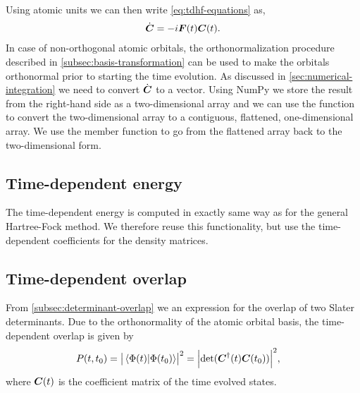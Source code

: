             Using atomic units we can then write \autoref{eq:tdhf-equations} as,
            \begin{align}
                \dot{\boldsymbol{C}} = -i\boldsymbol{F}(t)\boldsymbol{C}(t).
                \label{eq:tdhf-orthogonal}
            \end{align}
            In case of non-orthogonal atomic orbitals, the orthonormalization
            procedure described in \autoref{subsec:basis-transformation} can be
            used to make the orbitals orthonormal prior to starting the
            time evolution.
            As discussed in \autoref{sec:numerical-integration} we need to
            convert $\dot{\boldsymbol{C}}$ to a vector.
            Using NumPy we store the result from the right-hand side as a
            two-dimensional array and we can use the function  to
            convert the two-dimensional array to a contiguous, flattened,
            one-dimensional array.
            We use the member function  to go from the flattened
            array back to the two-dimensional form.

        \subsection{Time-dependent energy}
            The time-dependent energy is computed in exactly same way as for the
            general Hartree-Fock method.
            We therefore reuse this functionality, but use the time-dependent
            coefficients for the density matrices.

        \subsection{Time-dependent overlap}
            From \autoref{subsec:determinant-overlap} we an expression for the
            overlap of two Slater determinants.
            Due to the orthonormality of the atomic orbital basis, the
            time-dependent overlap is given by
            \begin{align}
                P(t, t_0)
                =
                \abs{\braket*{\Phi(t)}{\Phi(t_0)}}^2
                &= \abs{\determinant(\vf{C}^{\dagger}(t)\vf{C}(t_0))}^{2},
            \end{align}
            where $\boldsymbol{C}(t)$ is the coefficient matrix of the time evolved states.


